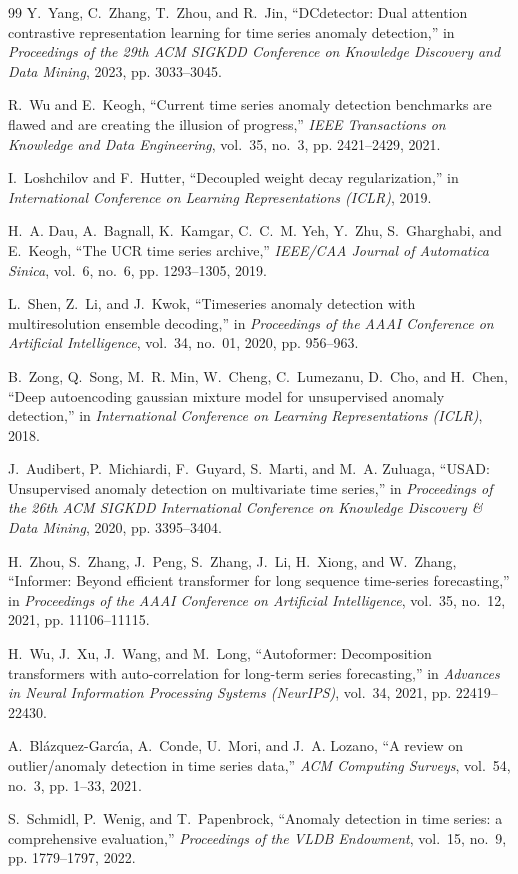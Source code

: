 \documentclass[11pt,journal,onecolumn]{IEEEtran}
\begin{document}
\begin{thebibliography}{99}
Y.~Yang, C.~Zhang, T.~Zhou, and R.~Jin, ``DCdetector: Dual attention contrastive representation learning for time series anomaly detection,'' in \emph{Proceedings of the 29th ACM SIGKDD Conference on Knowledge Discovery and Data Mining}, 2023, pp. 3033--3045.

R.~Wu and E.~Keogh, ``Current time series anomaly detection benchmarks are flawed and are creating the illusion of progress,'' \emph{IEEE Transactions on Knowledge and Data Engineering}, vol.~35, no.~3, pp. 2421--2429, 2021.

I.~Loshchilov and F.~Hutter, ``Decoupled weight decay regularization,'' in \emph{International Conference on Learning Representations (ICLR)}, 2019.

H.~A. Dau, A.~Bagnall, K.~Kamgar, C.~C.~M. Yeh, Y.~Zhu, S.~Gharghabi, and E.~Keogh, ``The UCR time series archive,'' \emph{IEEE/CAA Journal of Automatica Sinica}, vol.~6, no.~6, pp. 1293--1305, 2019.

L.~Shen, Z.~Li, and J.~Kwok, ``Timeseries anomaly detection with multiresolution ensemble decoding,'' in \emph{Proceedings of the AAAI Conference on Artificial Intelligence}, vol.~34, no.~01, 2020, pp. 956--963.

B.~Zong, Q.~Song, M.~R. Min, W.~Cheng, C.~Lumezanu, D.~Cho, and H.~Chen, ``Deep autoencoding gaussian mixture model for unsupervised anomaly detection,'' in \emph{International Conference on Learning Representations (ICLR)}, 2018.

J.~Audibert, P.~Michiardi, F.~Guyard, S.~Marti, and M.~A. Zuluaga, ``USAD: Unsupervised anomaly detection on multivariate time series,'' in \emph{Proceedings of the 26th ACM SIGKDD International Conference on Knowledge Discovery \& Data Mining}, 2020, pp. 3395--3404.

H.~Zhou, S.~Zhang, J.~Peng, S.~Zhang, J.~Li, H.~Xiong, and W.~Zhang, ``Informer: Beyond efficient transformer for long sequence time-series forecasting,'' in \emph{Proceedings of the AAAI Conference on Artificial Intelligence}, vol.~35, no.~12, 2021, pp. 11106--11115.

H.~Wu, J.~Xu, J.~Wang, and M.~Long, ``Autoformer: Decomposition transformers with auto-correlation for long-term series forecasting,'' in \emph{Advances in Neural Information Processing Systems (NeurIPS)}, vol.~34, 2021, pp. 22419--22430.

A.~Bl{\'a}zquez-Garc{\'\i}a, A.~Conde, U.~Mori, and J.~A. Lozano, ``A review on outlier/anomaly detection in time series data,'' \emph{ACM Computing Surveys}, vol.~54, no.~3, pp. 1--33, 2021.

S.~Schmidl, P.~Wenig, and T.~Papenbrock, ``Anomaly detection in time series: a comprehensive evaluation,'' \emph{Proceedings of the VLDB Endowment}, vol.~15, no.~9, pp. 1779--1797, 2022.
\end{thebibliography}
\end{document}
